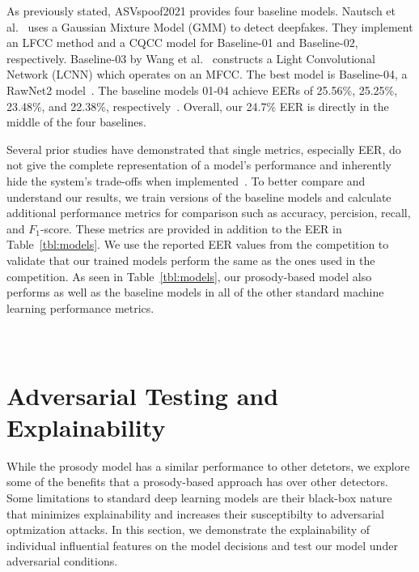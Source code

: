 \documentclass[10pt, journal, anonymous=true]{IEEEtran}
\begin{document}
As previously stated, ASVspoof2021 provides four baseline models.
Nautsch et al.~\cite{nautsch2021asvspoof} uses a Gaussian Mixture Model (GMM) to
detect deepfakes. They implement an LFCC method and a CQCC model for Baseline-01 and Baseline-02, respectively. Baseline-03 by Wang et al.~\cite{wang2021comparative} constructs a Light Convolutional Network (LCNN) which operates on an MFCC. The best model is Baseline-04, a RawNet2 model~\cite{9414234}. The baseline models 01-04 achieve EERs of 25.56\%, 25.25\%, 23.48\%, and 22.38\%, respectively~\cite{yamagishi_asvspoof_2021}. Overall, our 24.7\% EER is directly in the middle of the four baselines. 

Several prior studies have demonstrated that single metrics, especially EER, do not give the complete representation of a model's performance and inherently hide the system's trade-offs when implemented~\cite{needlestack_layton,osti_10091768}. To better compare and understand our results, we train versions of the baseline models and calculate additional performance metrics for comparison such as accuracy, percision, recall, and $F_1$-score. These metrics are provided in addition to the EER in Table~\ref{tbl:models}. We use the reported EER values from the competition to validate that our trained models perform the same as the ones used in the competition. As seen in Table~\ref{tbl:models}, our prosody-based model also performs as well as the baseline models in all of the other standard machine learning performance metrics.
\\
\\ \noindent{}
\\ 

\section{Adversarial Testing and Explainability} \label{sec:adversarial}

While the prosody model has a similar performance to other detetors, we explore some of the benefits that a prosody-based approach has over other detectors. Some limitations to standard deep learning models are their black-box nature that minimizes explainability and increases their susceptibilty to adversarial optmization attacks. In this section, we demonstrate the explainability of individual influential features on the model decisions and test our model under adversarial conditions.
\end{document}
